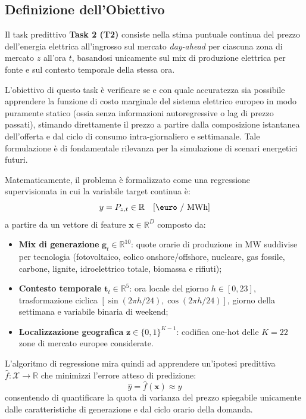 \subsection{Definizione dell'Obiettivo}
Il task predittivo \textbf{Task 2 (T2)} consiste nella stima puntuale continua del prezzo dell'energia elettrica all'ingrosso sul mercato \textit{day-ahead} per ciascuna zona di mercato $z$ all'ora $t$, basandosi unicamente sul mix di produzione elettrica per fonte e sul contesto temporale della stessa ora.

L'obiettivo di questo task è verificare se e con quale accuratezza sia possibile apprendere la funzione di costo marginale del sistema elettrico europeo in modo puramente statico (ossia senza informazioni autoregressive o lag di prezzo passati), stimando direttamente il prezzo a partire dalla composizione istantanea dell'offerta e dal ciclo di consumo intra-giornaliero e settimanale. Tale formulazione è di fondamentale rilevanza per la simulazione di scenari energetici futuri.

Matematicamente, il problema è formalizzato come una regressione supervisionata in cui la variabile target continua è:
\begin{equation}
y = P_{z,t} \in \mathbb{R} \quad [\text{\euro / MWh}]
\end{equation}
a partire da un vettore di feature $\mathbf{x} \in \mathbb{R}^{D}$ composto da:
\begin{itemize}
    \item \textbf{Mix di generazione} $\mathbf{g}_t \in \mathbb{R}^{10}$: quote orarie di produzione in MW suddivise per tecnologia (fotovoltaico, eolico onshore/offshore, nucleare, gas fossile, carbone, lignite, idroelettrico totale, biomassa e rifiuti);
    \item \textbf{Contesto temporale} $\mathbf{t}_t \in \mathbb{R}^{5}$: ora locale del giorno $h \in [0, 23]$, trasformazione ciclica $[\sin(2\pi h / 24), \cos(2\pi h / 24)]$, giorno della settimana e variabile binaria di weekend;
    \item \textbf{Localizzazione geografica} $\mathbf{z} \in \{0, 1\}^{K-1}$: codifica one-hot delle $K=22$ zone di mercato europee considerate.
\end{itemize}

L'algoritmo di regressione mira quindi ad apprendere un'ipotesi predittiva $\hat{f}: \mathcal{X} \to \mathbb{R}$ che minimizzi l'errore atteso di predizione:
\begin{equation}
\hat{y} = \hat{f}(\mathbf{x}) \approx y
\end{equation}
consentendo di quantificare la quota di varianza del prezzo spiegabile unicamente dalle caratteristiche di generazione e dal ciclo orario della domanda.

